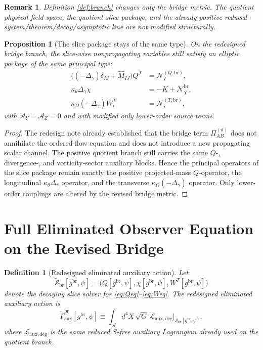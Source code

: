 \documentclass[11pt]{article}
\newcommand{\Sub}{\mathcal{A}}
\newcommand{\PiTheta}{\Pi^{(\vartheta)}}
\newcommand{\AY}{\mathcal A_Y}
\newcommand{\AZ}{\mathcal A_Z}
\newtheorem{definition}{Definition}
\newtheorem{proposition}{Proposition}
\newtheorem{remark}{Remark}
\begin{document}
\begin{remark}
Definition \ref{def:branch} changes only the bridge metric. The quotient physical field space, the quotient slice package, and the already-positive reduced-system/theorem/decay/asymptotic line are not modified structurally.
\end{remark}

\begin{proposition}[The slice package stays of the same type]
\label{prop:slice}
On the redesigned bridge branch, the slice-wise nonpropagating variables still satisfy an elliptic package of the same principal type:
\begin{align}
\bigl((-\Delta_\gamma)\delta_{IJ}+\widehat M_{IJ}\bigr)Q^J
&=
\mathcal N_I^{(Q,\mathrm{br})},
\label{eq:Qeq}
\\
\kappa_\theta\Delta_\gamma\chi
&=
-K+\mathcal N_\chi^{\mathrm{br}},
\label{eq:chieq}
\\
\kappa_\Omega(-\Delta_\gamma)W_i^T
&=
\mathcal N_i^{(T,\mathrm{br})},
\label{eq:Weq}
\end{align}
with \(\AY=\AZ=0\) and with modified only lower-order source terms.
\end{proposition}

\begin{proof}
The redesign note already established that the bridge term \(\PiTheta_{AB}\) does not annihilate the ordered-flow equation and does not introduce a new propagating scalar channel. The positive quotient branch still carries the same \(Q\)-, divergence-, and vorticity-sector auxiliary blocks. Hence the principal operators of the slice package remain exactly the positive projected-mass \(Q\)-operator, the longitudinal \(\kappa_\theta\Delta_\gamma\) operator, and the transverse \(\kappa_\Omega(-\Delta_\gamma)\) operator. Only lower-order couplings are altered by the revised bridge metric.
\end{proof}

\section{Full Eliminated Observer Equation on the Revised Bridge}

\begin{definition}[Redesigned eliminated auxiliary action]
\label{def:Gamma}
Let
\[
\widetilde{\mathscr S}_{\mathrm{br}}[g^{\mathrm{br}},\psi]
=
\bigl(Q[g^{\mathrm{br}},\psi],\chi[g^{\mathrm{br}},\psi],W^T[g^{\mathrm{br}},\psi]\bigr)
\]
denote the decaying slice solver for \eqref{eq:Qeq}--\eqref{eq:Weq}. The \emph{redesigned eliminated auxiliary action} is
\begin{equation}
\widetilde{\Gamma}_{\mathrm{aux}}^{\mathrm{br}}[g^{\mathrm{br}},\psi]
\equiv
\int_{\Sub} d^4X\,\sqrt{G}\,
\mathcal L_{\mathrm{aux,deg}}
\Big|_{\widetilde{\mathscr S}_{\mathrm{br}}[g^{\mathrm{br}},\psi]},
\label{eq:Gamma}
\end{equation}
where \(\mathcal L_{\mathrm{aux,deg}}\) is the same reduced \(S\)-free auxiliary Lagrangian already used on the quotient branch.
\end{definition}
\end{document}
